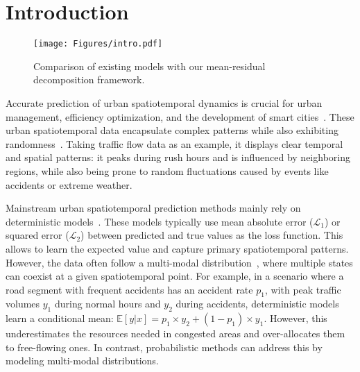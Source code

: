 \section{Introduction}


\begin{figure}[t]
    \centering
    \texttt{[image: Figures/intro.pdf]}
    \caption{Comparison of existing models with our mean-residual decomposition framework.}
    \label{fig:intro}
\end{figure}




Accurate prediction of urban spatiotemporal dynamics is crucial for urban management, efficiency optimization, and the development of smart cities~\cite{zhang2017deep,xie2020urban,jin2023spatio,yuan2024foundation}. These urban spatiotemporal data encapsulate complex patterns while also exhibiting randomness~\cite{sheng2025unveiling,chirigati2016data,li2020just,behnisch2009urban,zhang2017deep}. Taking traffic flow data as an example, it displays clear temporal and spatial patterns: it peaks during rush hours and is influenced by neighboring regions, while also being prone to random fluctuations caused by events like accidents or extreme weather.



Mainstream urban spatiotemporal prediction methods mainly rely on deterministic models~\cite{shao2022spatial,yan2018spatial,yuan2024unist,yuan2024foundation,zhang2017deep}. These models typically use mean absolute error ($\mathcal{L}_1$) or squared error ($\mathcal{L}_2$) between predicted and true values as the loss function. This allows to learn the expected value and capture primary spatiotemporal patterns. However, the data often follow a multi-modal distribution~\cite{gao2024enhancing,han2022card}, where multiple states can coexist at a given spatiotemporal point.
For example, in a scenario where a road segment with frequent accidents has an accident rate \(p_1\), with peak traffic volumes $y_1$ during normal hours and $y_2$ during accidents, deterministic models learn a conditional mean: \(\mathbb{E}[y|x]=p_1\times y_2+(1 - p_1)\times y_1\). However, this underestimates the resources needed in congested areas and over-allocates them to free-flowing ones. In contrast, probabilistic methods can address this by modeling multi-modal distributions.



